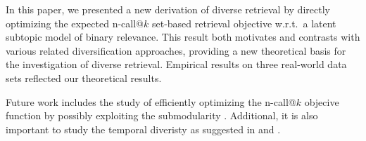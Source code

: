 In this paper, we presented a new derivation of diverse retrieval by directly
optimizing the expected n-call@$k$ set-based retrieval objective
w.r.t.\ a latent subtopic model of binary relevance.  This result both
motivates and contrasts with various related diversification
approaches, providing a new theoretical basis for the investigation
of diverse retrieval. Empirical results on three real-world data sets reflected our theoretical results. 

Future work includes the study of efficiently optimizing the n-call@$k$ objecive function by possibly exploiting the submodularity \cite{Borodin:Database2012}. Additional, it is also important to study the temporal diveristy as suggested in \cite{lathia10TemporalDiversity} and \cite{Zhao:SIGIR2012}. 

\appendix